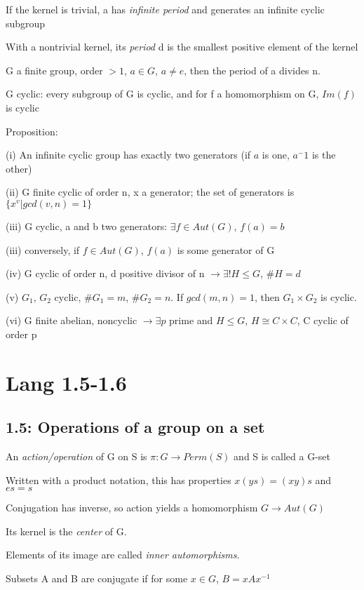 \documentclass[12pt]{article}
\newcommand{\inv}{^{-1}}
\begin{document}
If the kernel is trivial, a has \textit{infinite period} and generates an infinite cyclic subgroup

With a nontrivial kernel, its \textit{period} d is the smallest positive element of the kernel

\noindent
G a finite group, order $> 1$, $a \in G$, $a \neq e$, then the period of a divides n.

\noindent
G cyclic: every subgroup of G is cyclic, and for f a homomorphism on G, $Im(f)$ is cyclic

\noindent
Proposition:

(i) An infinite cyclic group has exactly two generators (if $a$ is one, $a^-1$ is the other)

(ii) G finite cyclic of order n, x a generator; the set of generators is $\{x^v| gcd(v, n) = 1\}$

(iii) G cyclic, a and b two generators: $\exists f \in Aut(G)$, $f(a) = b$

(iii) conversely, if $f \in Aut(G)$, $f(a)$ is some generator of G

(iv) G cyclic of order n, d positive divisor of n $\to \exists ! H \leq G$, $\#H = d$

(v) $G_1$, $G_2$ cyclic, $\#G_1 = m$, $\#G_2 = n$.  If $gcd(m, n) = 1$, then $G_1 \times G_2$ is cyclic.

(vi) G finite abelian, noncyclic $\to \exists p$ prime and $H \leq G$, $H \cong C \times C$, C cyclic of order p

\section{Lang 1.5-1.6}

\subsection{1.5: Operations of a group on a set}

\noindent
An \textit{action/operation} of G on S is $\pi: G \to Perm(S)$ and S is called a G-set

Written with a product notation, this has properties $x(ys) = (xy)s$ and $es = s$

\noindent
Conjugation has inverse, so action yields a homomorphism $G \to Aut(G)$

Its kernel is the \textit{center} of G.

Elements of its image are called \textit{inner automorphisms}.

Subsets A and B are conjugate if for some $x \in G$, $B = xAx\inv$
\end{document}
